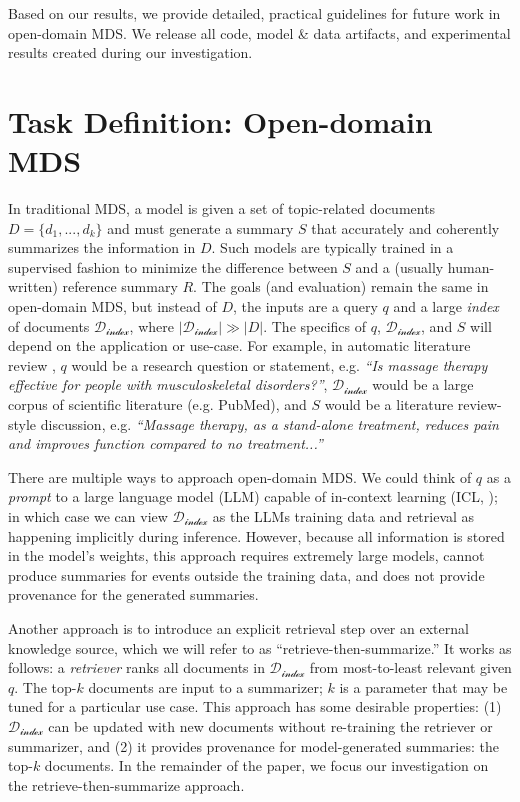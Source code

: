 \documentclass[11pt]{article}
\begin{document}
\noindent Based on our results, we provide detailed, practical guidelines for future work in open-domain MDS. We release all code, model \& data artifacts, and experimental results created during our investigation.

\vspace{-1.0mm}
\section{Task Definition: Open-domain MDS}
\label{open-mds}
\vspace{-1.0mm}

In traditional MDS, a model is given a set of topic-related documents \(D = \{d_1, ..., d_k\}\) and must generate a summary \(S\) that accurately and coherently summarizes the information in \(D\). Such models are typically trained in a supervised fashion to minimize the difference between \(S\) and a (usually human-written) reference summary \(R\). The goals (and evaluation) remain the same in open-domain MDS, but instead of \(D\), the inputs are a query \(q\) and a large \textit{index} of documents \(\mathcal{D_\text{index}}\), where \(\lvert \mathcal{D_\text{index}} \rvert \gg \lvert D \rvert\). The specifics of \(q\), \(\mathcal{D_\text{index}}\), and \(S\) will depend on the application or use-case. For example, in automatic literature review \citep{cochrane, deyoung-etal-2021-ms}, \(q\) would be a research question or statement, e.g. \textit{``Is massage therapy effective for people with musculoskeletal disorders?''}, \(\mathcal{D_\text{index}}\) would be a large corpus of scientific literature (e.g. PubMed), and \(S\) would be a literature review-style discussion, e.g. \textit{``Massage therapy, as a stand-alone treatment, reduces pain and improves function compared to no treatment...''}

There are multiple ways to approach open-domain MDS. We could think of \(q\) as a \textit{prompt} to a large language model (LLM) capable of in-context learning (ICL, \citealt{GPT3}); in which case we can view \(\mathcal{D_\text{index}}\) as the LLMs training data and retrieval as happening implicitly during inference. However, because all information is stored in the model's weights, this approach requires extremely large models, cannot produce summaries for events outside the training data, and does not provide provenance for the generated summaries. 

Another approach is to introduce an explicit retrieval step over an external knowledge source, which we will refer to as ``retrieve-then-summarize.'' It works as follows: a \textit{retriever} ranks all documents in \(\mathcal{D_\text{index}}\) from most-to-least relevant given \(q\). The top-\(k\) documents are input to a summarizer; \(k\) is a parameter that may be tuned for a particular use case. This approach has some desirable properties: (1) \(\mathcal{D_\text{index}}\) can be updated with new documents without re-training the retriever or summarizer, and (2) it provides provenance for model-generated summaries: the top-\(k\) documents. In the remainder of the paper, we focus our investigation on the retrieve-then-summarize approach.
\end{document}
